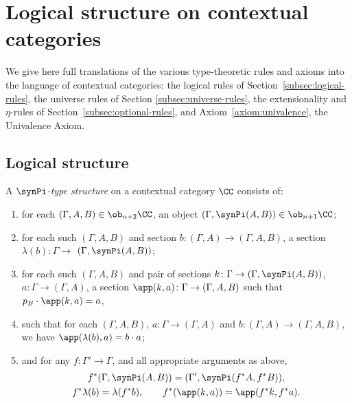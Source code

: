 
\section{Logical structure on contextual categories} \label{app:cxl-structure}

We give here full translations of the various type-theoretic rules and axioms into the language of contextual categories: the logical rules of Section~\ref{subsec:logical-rules}, the universe rules of Section \ref{subsec:universe-rules}, the extensionality and $\eta$-rules of Section~\ref{subsec:optional-rules}, and Axiom~\ref{axiom:univalence}, the Univalence Axiom.

\subsection{Logical structure}

\begin{definition}
A \emph{$\synPi$-type structure} on a contextual category $\CC$ consists of:
\begin{enumerate}
  \item for each $(\Gamma, A, B) \in \ob_{n+2} \CC$, an object $(\Gamma, \synPi(A, B)) \in \ob_{n+1} \CC$;
  \item for each such $(\Gamma, A, B) $ and section $b \colon (\Gamma, A) \to (\Gamma, A, B)$, a section $\lambda(b) \colon \Gamma \to$ $(\Gamma, \synPi(A, B))$;
  \item for each such $(\Gamma, A, B) $ and pair of sections $k \colon \Gamma \to (\Gamma, \synPi (A, B))$, $a \colon \Gamma \to (\Gamma, A)$, a section $\app(k,a) \colon \Gamma \to (\Gamma, A, B)$ such that $p_B \cdot \app(k,a) = a$,
 \item such that for each $(\Gamma, A, B)$, $a \colon \Gamma \to (\Gamma, A)$ and $b \colon (\Gamma, A) \to (\Gamma, A, B)$, we have $\app(\lambda(b),a) = b \cdot a$;
 \item and for any $f \colon \Gamma' \to \Gamma$, and all appropriate arguments as above,
   \begin{gather*}
     f^*(\Gamma, \synPi(A, B)) = (\Gamma', \synPi(f^*A, f^*B)), \\
     f^*\lambda(b) = \lambda({f^*b}), \qquad f^*(\app(k,a)) = \app(f^*k,f^*a).
   \end{gather*}
 \end{enumerate}
\end{definition}

